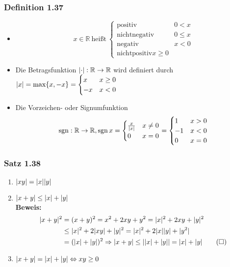 \documentclass[11pt]{article}
\DeclarePairedDelimiter\abs{\lvert}{\rvert}%
\DeclareMathOperator{\sgn}{sgn}
\begin{document}
\subsubsection{Definition 1.37}
\label{sec-2-9-5}
\begin{itemize}
\item \[x\in \mathbb{R}~\text{heißt}~\begin{cases}\text{positiv} & 0 < x \\ \text{nichtnegativ} & 0\leq x \\ \text{negativ} & x < 0 \\ \text{nichtpositiv} x\geq 0 \end{cases}\]
\item Die Betragsfunktion $\abs \cdot:\mathbb{R} \to \mathbb{R}$ wird definiert durch $\abs{x} = \max \{x,-x\} = \begin{cases} x & x \geq 0 \\ -x & x < 0\end{cases}$
\item Die Vorzeichen- oder Signumfunktion \[\sgn:\mathbb{R}\to\mathbb{R},\sgn{x} = \begin{cases}\frac{x}{\abs{x}} & x \neq 0 \\ 0 & x = 0\end{cases} = \begin{cases} 1 & x > 0 \\ -1 & x < 0 \\ 0 & x = 0\end{cases}\]
\end{itemize}
\subsubsection{Satz 1.38}
\label{sec-2-9-6}
\begin{enumerate}
\item $\abs{x y} = \abs{x} \abs{y}$
\item $\abs{x + y} \leq \abs{x} + \abs{y}$ \\
       \textbf{Beweis:} \\
\begin{align}
\abs{x + y}^2 &= (x+y)^2 = x^2 + 2x y + y^2 = \abs{x}^2 + 2xy + \abs{y}^2 \\
&\leq \abs{x}^2 + 2\abs{x y} + \abs{y}^2 = \abs{x}^2 + 2\abs{x}\abs{y} + \abs{y^2} \\
&= (\abs{x} + \abs{y})^2 \Rightarrow \abs{x + y} \leq \abs{\abs{x} + \abs{y}} = \abs{x} + \abs{y} \tag{$\square$}
\end{align}
\item $\abs{x + y} = \abs{x} + \abs{y} \Leftrightarrow x y \geq 0$
\end{enumerate}
\end{document}
